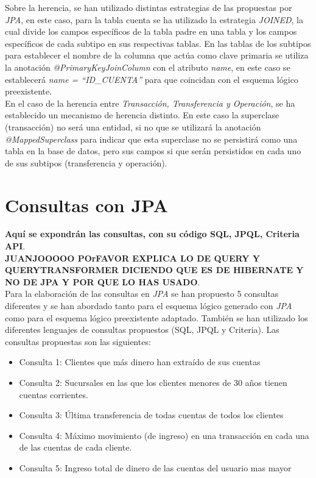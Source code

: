 \documentclass[11pt,a4paper]{article}
\begin{document}
Sobre la herencia, se han utilizado distintas estrategias de las propuestas por \emph{JPA}, en este caso, para la tabla cuenta se ha utilizado la estrategia \emph{JOINED}, la cual divide los campos específicos de la tabla padre en una tabla y los campos específicos de cada subtipo en sus respectivas tablas. En las tablas de los subtipos para establecer el nombre de la columna que actúa como clave primaria se utiliza la anotación \emph{@PrimaryKeyJoinColumn} con el atributo \emph{name}, en este caso se establecerá \emph{name = ``ID\_{}CUENTA''} para que coincidan con el esquema lógico preexistente.\\
En el caso de la herencia entre \emph{Transacción, Transferencia y Operación}, se ha establecido un mecanismo de herencia distinto. En este caso la superclase (transacción) no será una entidad, si no que se utilizará la anotación \emph{@MappedSuperclass} para indicar que esta superclase no se persistirá como una tabla en la base de datos, pero sus campos si que serán persistidos en cada uno de sus subtipos (transferencia y operación).

\newpage
\section{Consultas con JPA}

\textbf{Aquí se expondrán las consultas, con su código SQL, JPQL, Criteria API}.\\
\textbf{JUANJOOOOO POrFAVOR EXPLICA LO DE QUERY Y QUERYTRANSFORMER DICIENDO QUE ES DE HIBERNATE Y NO DE JPA Y POR QUE LO HAS USADO}.\\
Para la elaboración de las consultas en \emph{JPA} se han propuesto 5 consultas diferentes y se han abordado tanto para el esquema lógico generado con \emph{JPA} como para el esquema lógico preexistente adaptado. También se han utilizado los diferentes lenguajes de consultas propuestos (SQL, JPQL y Criteria). Las consultas propuestas son las siguientes:

\begin{itemize}
\item Consulta 1: Clientes que más dinero han extraído de sus cuentas
\item Consulta 2: Sucursales en las que los clientes menores de 30 años tienen cuentas corrientes.
\item Consulta 3: Última transferencia de todas cuentas de todos los clientes
\item Consulta 4: Máximo movimiento (de ingreso) en una transacción en cada una de las cuentas de cada cliente.
\item Consulta 5: Ingreso total de dinero de las cuentas del usuario mas mayor
\end{itemize}
\end{document}
